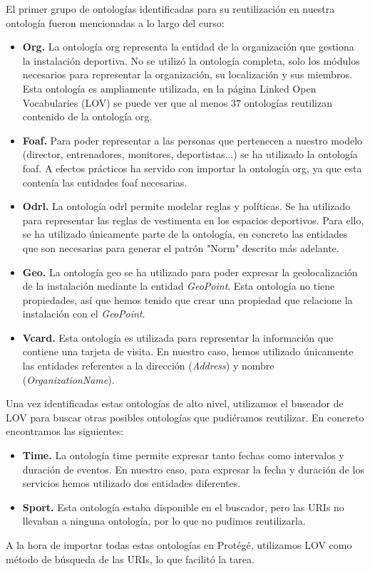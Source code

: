 \documentclass[a4paper,12pt]{article}
\begin{document}
	El primer grupo de ontologías identificadas para su reutilización en nuestra ontología fueron mencionadas a lo largo del curso:
	\begin{itemize}
		\item \textbf{Org.} La ontología org representa la entidad de la organización que gestiona la instalación deportiva. No se utilizó la ontología completa, solo los módulos necesarios para representar la organización, su localización y sus miembros. Esta ontología es ampliamente utilizada, en la página Linked Open Vocabularies (LOV) \cite{lov} se puede ver que al menos $37$ ontologías reutilizan contenido de la ontología org.
		\item \textbf{Foaf.} Para poder representar a las personas que pertenecen a nuestro modelo (director, entrenadores, monitores, deportistas...) se ha utilizado la ontología foaf. A efectos prácticos ha servido con importar la ontología org, ya que esta contenía las entidades foaf necesarias.
		\item \textbf{Odrl.} La ontología odrl permite modelar reglas y políticas. Se ha utilizado para representar las reglas de vestimenta en los espacios deportivos. Para ello, se ha utilizado únicamente parte de la ontología, en concreto las entidades que son necesarias para generar el patrón "Norm" descrito más adelante.
		\item \textbf{Geo.} La ontología geo se ha utilizado para poder expresar la geolocalización de la instalación mediante la entidad \textit{GeoPoint}. Esta ontología no tiene propiedades, así que hemos tenido que crear una propiedad que relacione la instalación con el \textit{GeoPoint}. 
		\item \textbf{Vcard.} Esta ontología es utilizada para representar la información que contiene una tarjeta de visita. En nuestro caso, hemos utilizado únicamente las entidades referentes a la dirección (\textit{Address}) y nombre (\textit{OrganizationName}).
		
	\end{itemize}
	Una vez identificadas estas ontologías de alto nivel, utilizamos el buscador de LOV para buscar otras posibles ontologías que pudiéramos reutilizar. En concreto encontramos las siguientes:
	
	\begin{itemize}
		\item \textbf{Time.} La ontología time permite expresar tanto fechas como intervalos y duración de eventos. En nuestro caso, para expresar la fecha y duración de los servicios hemos utilizado dos entidades diferentes.
		\item \textbf{Sport.} Esta ontología estaba disponible en el buscador, pero las URIs no llevaban a ninguna ontología, por lo que no pudimos reutilizarla. 
	\end{itemize}
	A la hora de importar todas estas ontologías en Protégé, utilizamos LOV como método de búsqueda de las URIs, lo que facilitó la tarea. 
	
\end{document}
